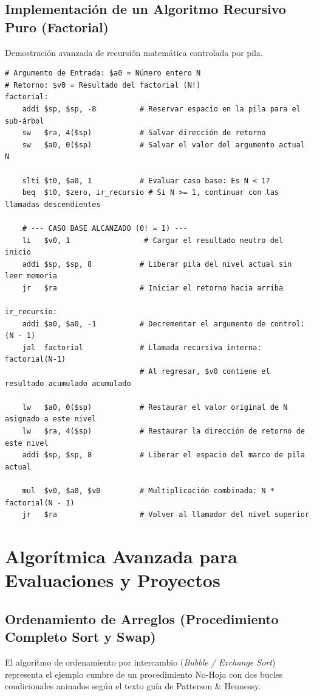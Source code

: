 \documentclass[11pt,letterpaper]{article}
\begin{document}
\subsection{Implementación de un Algoritmo Recursivo Puro (Factorial)}
Demostración avanzada de recursión matemática controlada por pila.
\begin{lstlisting}[caption={Código máquina para el cálculo recursivo de N!.}]
# Argumento de Entrada: $a0 = Número entero N
# Retorno: $v0 = Resultado del factorial (N!)
factorial:
    addi $sp, $sp, -8          # Reservar espacio en la pila para el sub-árbol
    sw   $ra, 4($sp)           # Salvar dirección de retorno
    sw   $a0, 0($sp)           # Salvar el valor del argumento actual N
    
    slti $t0, $a0, 1           # Evaluar caso base: Es N < 1?
    beq  $t0, $zero, ir_recursio # Si N >= 1, continuar con las llamadas descendientes
    
    # --- CASO BASE ALCANZADO (0! = 1) ---
    li   $v0, 1                 # Cargar el resultado neutro del inicio
    addi $sp, $sp, 8           # Liberar pila del nivel actual sin leer memoria
    jr   $ra                   # Iniciar el retorno hacia arriba
    
ir_recursio:
    addi $a0, $a0, -1          # Decrementar el argumento de control: (N - 1)
    jal  factorial             # Llamada recursiva interna: factorial(N-1)
                               # Al regresar, $v0 contiene el resultado acumulado acumulado
                               
    lw   $a0, 0($sp)           # Restaurar el valor original de N asignado a este nivel
    lw   $ra, 4($sp)           # Restaurar la dirección de retorno de este nivel
    addi $sp, $sp, 8           # Liberar el espacio del marco de pila actual
    
    mul  $v0, $a0, $v0         # Multiplicación combinada: N * factorial(N - 1)
    jr   $ra                   # Volver al llamador del nivel superior
\end{lstlisting}

\newpage

\section{Algorítmica Avanzada para Evaluaciones y Proyectos}

\subsection{Ordenamiento de Arreglos (Procedimiento Completo Sort y Swap)}
El algoritmo de ordenamiento por intercambio (\textit{Bubble / Exchange Sort}) representa el ejemplo cumbre de un procedimiento No-Hoja con dos bucles condicionales aninados según el texto guía de Patterson \& Hennessy.
\end{document}
